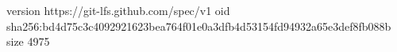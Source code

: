 version https://git-lfs.github.com/spec/v1
oid sha256:bd4d75c3c4092921623bea764f01e0a3dfb4d53154fd94932a65e3def8fb088b
size 4975
